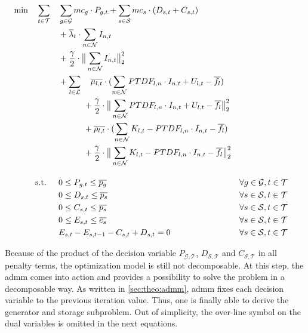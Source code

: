 \begin{subequations}
	\begin{align}
		 \min \quad \sum_{t\in\mathcal{T}} \quad & \sum_{g\in\mathcal{G}}mc_g \cdot P_{g,t} + \sum_{s\in\mathcal{S}}mc_s \cdot (D_{s,t}+C_{s,t}) \label{eq:dom:final} \\
		 & + \overline{\lambda}_t \cdot \sum_{n \in \mathcal{N}} I_{n,t} \nonumber \\
		 & + \frac{\gamma}{2} \cdot \big\|\sum_{n \in \mathcal{N}} I_{n,t}\big\|^2_2 \nonumber \\
		 & +  \sum_{l \in \mathcal{L}} \quad \overline{\mu_{l,t}} \cdot (\sum_{n \in \mathcal{N}} PTDF_{l,n} \cdot I_{n,t} + U_{l,t} - \overline{f_l}) \nonumber \\
		 & \quad \qquad + \frac{\gamma}{2} \cdot \big\| \sum_{n \in \mathcal{N}} PTDF_{l,n} \cdot I_{n,t} + U_{l,t} - \overline{f_l} \big\|^2_2 \nonumber \\
		 & \quad \qquad + \overline{\rho_{l,t}} \cdot (\sum_{n \in \mathcal{N}} K_{l,t} - PTDF_{l,n} \cdot I_{n,t} - \overline{f_l}) \nonumber \\
		 & \quad \qquad + \frac{\gamma}{2} \cdot \big\|\sum_{n \in \mathcal{N}} K_{l,t} - PTDF_{l,n} \cdot I_{n,t} - \overline{f_l} \big\|^2_2 \nonumber \\[10pt]
		 \text{s.t. } \quad & 0 \leq P_{g,t} \leq \overline{p_g} && \forall g \in \mathcal{G}, t \in \mathcal{T}\\
		 & 0 \leq D_{s,t} \leq \overline{p_s} && \forall s \in \mathcal{S}, t \in \mathcal{T} \\
		 & 0 \leq C_{s,t} \leq \overline{p_s} && \forall s \in \mathcal{S}, t \in \mathcal{T} \\
		 & 0 \leq E_{s,t} \leq \overline{e_s} && \forall s \in \mathcal{S}, t \in \mathcal{T} \\
		 & E_{s,t} - E_{s,t-1} - C_{s,t} + D_{s,t} = 0 && \forall s \in \mathcal{S}, t \in \mathcal{T}
	\end{align}
\end{subequations}

Because of the product of the decision variable $P_{\mathcal{G},\mathcal{T}}$, $D_{\mathcal{S},\mathcal{T}}$ and $C_{\mathcal{S},\mathcal{T}}$ in all penalty terms, the optimization model is still not decomposable. At this step, the \gls{admm} comes into action and provides a possibility to solve the problem in a decomposable way. As written in \ref{sec:theo:admm}, \gls{admm} fixes each decision variable to the previous iteration value. Thus, one is finally able to derive the generator and storage subproblem. Out of simplicity, the over-line symbol on the dual variables is omitted in the next equations.


